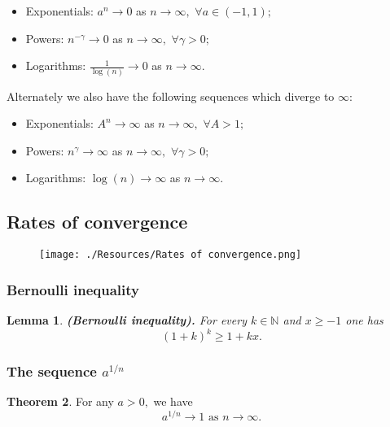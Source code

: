 \documentclass[12pt, a4paper]{article}
\newcommand{\bb}[1]{\mathbb{#1}}
\newcommand{\f}[2]{\frac{#1}{#2}}
\theoremstyle{definition}
\newtheorem{theorem}{Theorem}[section]
\theoremstyle{plain}
\newtheorem{lemma}[theorem]{Lemma}
\begin{document}
\begin{itemize}

	\item Exponentials: $a^n \to 0$ as $n \to \infty,$ $\forall a\in (-1,1);$

	\item Powers: $n^{-\gamma}\to 0$ as $n \to \infty,$ $\forall \gamma>0;$

	\item Logarithms: $\f{1}{\log(n)} \to 0$ as $n \to \infty.$

\end{itemize}

Alternately we also have the following sequences which diverge to $\infty:$

\begin{itemize}
	\item Exponentials: $A^n \to \infty$ as $n \to \infty,$ $\forall A>1;$

	\item Powers: $n^{\gamma}\to \infty$ as $n \to \infty,$ $\forall \gamma >0;$

	\item Logarithms: $\log(n) \to \infty$ as $n \to \infty.$
\end{itemize}

\subsection{Rates of convergence}

\begin{figure}[H]
\centering
\texttt{[image: ./Resources/Rates of convergence.png]}
\end{figure}

\subsubsection{Bernoulli inequality}

\begin{lemma}\textbf{(Bernoulli inequality).} For every $k\in \bb{N}$ and $x\geq -1$ one has $$(1+k)^k\geq 1+kx.$$

\end{lemma}

\subsubsection{The sequence \texorpdfstring{$a^{1/n}$}{TEXT}}

\begin{theorem}
For any $a>0,$ we have $$a^{1/n} \to 1 \text{ as } n\to \infty.$$ 
\end{theorem}
\end{document}
